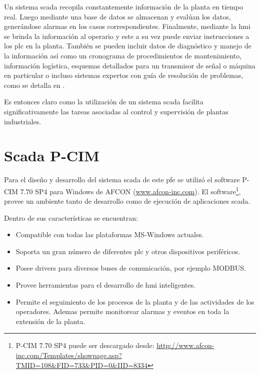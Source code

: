 Un sistema \gls{scada} recopila constantemente información de la planta en 
tiempo real. Luego mediante una base de datos se almacenan y evalúan los datos, 
generándose alarmas en los casos correspondientes. Finalmente, mediante
la \gls{hmi} se brinda la información al operario y este a su vez puede enviar 
instrucciones a los \gls{plc} en la planta. También se pueden incluir datos de 
diagnóstico y manejo de la información así como un cronograma de procedimientos 
de mantenimiento, información logística, esquemas detallados para un transmisor de señal o 
máquina en particular o incluso sistemas expertos con guía de resolución de 
problemas, como se detalla en \cite{bib:ManualScada}.

Es entonces claro como la utilización de un sistema \gls{scada} facilita 
significativamente las tareas asociadas al control y supervisión de plantas 
industriales.

\section{Scada P-CIM}
\label{sec:ScadaPCIM} 
Para el diseño y desarrollo del sistema \gls{scada} de este \gls{pfe} se 
utilizó el software P-CIM 7.70 SP4 para Windows de AFCON 
(\url{www.afcon-inc.com}). El software\footnote{P-CIM 7.70 SP4 puede
ser descargado desde:
\url{
http://www.afcon-inc.com/Templates/showpage.asp?TMID=108&FID=733&PID=0&IID=8334}
}, provee un ambiente tanto de desarrollo
como de ejecución de aplicaciones \gls{scada}.

Dentro de sus características se encuentran:
\begin{itemize}
 \item Compatible con todas las plataformas MS-Windows actuales.
 \item Soporta un gran número de diferentes \gls{plc} y otros dispositivos 
  periféricos.
 \item Posee drivers para diversos buses de comunicación, por ejemplo MODBUS.
 \item Provee herramientas para el desarrollo de \gls{hmi} inteligentes.
 \item Permite el seguimiento de los procesos de la planta y de las actividades
  de los operadores. Ademas permite monitorear alarmas y eventos en toda la 
  extensión de la planta.
\end{itemize}


